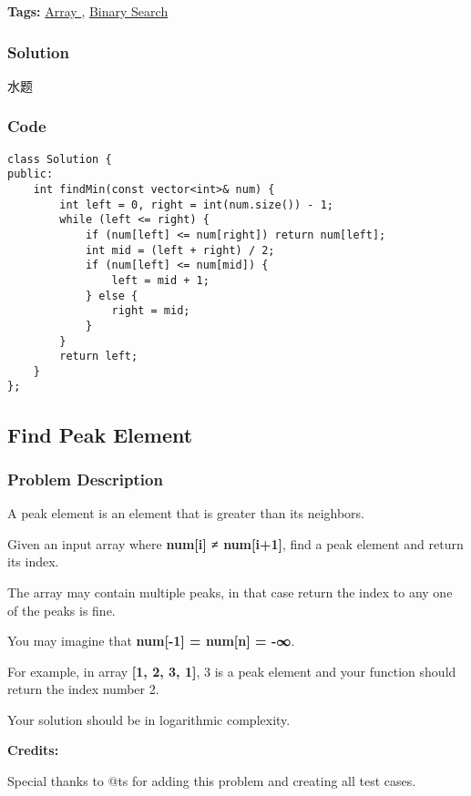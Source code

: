 \documentclass{article}
\begin{document}
\begin{CJK*}{UTF8}{gkai}
\textbf{Tags: }
\hyperref[ Array ]{ Array },  \hyperref[ Binary Search ]{ Binary Search }



\subsubsection*{Solution}
水题

\subsubsection*{Code}
\begin{lstlisting}
class Solution {
public:
    int findMin(const vector<int>& num) {
        int left = 0, right = int(num.size()) - 1;
        while (left <= right) {
            if (num[left] <= num[right]) return num[left];
            int mid = (left + right) / 2;
            if (num[left] <= num[mid]) {
                left = mid + 1;
            } else {
                right = mid;
            }
        }
        return left;
    }
}; 
\end{lstlisting}


\subsection{ Find Peak Element }
\label{ Find Peak Element }

\subsubsection*{Problem Description}
A peak element is an element that is greater than its neighbors.

Given an input array where \textbf{num[i] ≠ num[i+1]}, find a peak element and return its index.

The array may contain multiple peaks, in that case return the index to any one of the peaks is fine.

You may imagine that \textbf{num[-1] = num[n] = -∞}.

For example, in array \textbf{[1, 2, 3, 1]}, 3 is a peak element and your function should return the index number 2.

Your solution should be in logarithmic complexity.

\textbf{Credits:}

Special thanks to @ts for adding this problem and creating all test cases.



\end{CJK*}
\end{document}
